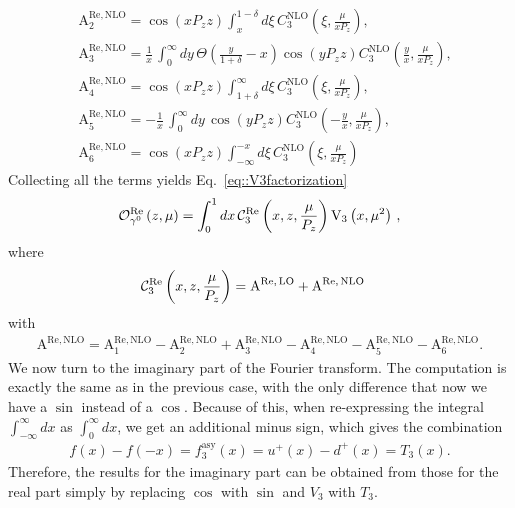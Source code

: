 \begin{align}
	& \text{A}^{\text{Re},\,\text{NLO}}_2 = \cos(x P_z z)\int_{x}^{1-\delta}d\xi \,
		C_3^{\text{NLO}}\left(\xi,\frac{\mu}{xP_z}\right), \\
	& \text{A}^{\text{Re},\,\text{NLO}}_3 = \frac{1}{x}\,\int_{0}^{\infty} dy\,
		\Theta\left(\frac{y}{1+\delta}-x\right) \cos\left(y P_z z\right)C_3^{\text{NLO}}\left(\frac{y}{x},\frac{\mu}{x P_z}\right), \\
	& \text{A}^{\text{Re},\,\text{NLO}}_4 = \cos(x P_z z)\int_{1+\delta}^{\infty}d\xi\,
		C_3^{\text{NLO}}\left(\xi,\frac{\mu}{xP_z}\right), \\
	& \text{A}^{\text{Re},\,\text{NLO}}_5 = -\frac{1}{x}\,\int_{0}^{\infty} dy\,
		\cos\left(y P_z z\right) 
		C_3^{\text{NLO}}\left(-\frac{y}{x},\frac{\mu}{x P_z}\right), \\
	& \text{A}^{\text{Re},\,\text{NLO}}_6 = \cos(x P_z z) \int_{-\infty}^{-x}d\xi \,
		C_3^{\text{NLO}}\left(\xi,\frac{\mu}{xP_z}\right)
\end{align}
Collecting all the terms yields Eq.~\eqref{eq::V3factorization}
\begin{align}
	\mathcal{O}_{\gamma^0}^{\text{Re}}\left( z,\mu \right) = \int_{0}^{1} dx \, \mathcal{C}_3^{\text{Re}}\left( x, z, \frac{\mu}{P_z}\right) 
	\mathrm{V}_3\left(x,\mu^2\right)\, , 
\end{align}
where
\begin{align}
	\mathcal{C}_3^{\text{Re}}&\left( x, z, \frac{\mu}{P_z}  \right) = 
	\text{A}^{\text{Re},\,\text{LO}} + \text{A}^{\text{Re},\,\text{NLO}}  
\end{align}
with
\begin{align}
	\text{A}^{\text{Re},\,\text{NLO}}= 
	\text{A}^{\text{Re}, \,\text{NLO}}_1 - \text{A}^{\text{Re}, \,\text{NLO}}_2 + \text{A}^{\text{Re}, \,\text{NLO}}_3 
	- \text{A}^{\text{Re}, \,\text{NLO}}_4 - \text{A}^{\text{Re}, \,\text{NLO}}_5 - \text{A}^{\text{Re}, \,\text{NLO}}_6. 
\end{align}
%
We now turn to the imaginary part of the Fourier transform. The computation is
exactly the same as in the previous case, with the only difference that now we
have a $\sin$ instead of a $\cos$. Because of this, when re-expressing the
integral $\int_{-\infty}^{\infty} dx$ as $\int_{0	}^{\infty} dx $, we get an
additional minus sign, which gives the combination
\begin{align} 
	f\left(x\right)-f\left(-x\right) = f_3^{\text{asy}}\left(x\right) = u^+\left(x\right) - d^+\left(x\right) = T_3\left(x\right). 
\end{align} 
Therefore, the results for the imaginary part can be obtained from those for the real part simply by replacing $\cos$ with $\sin$ and $V_3$ with $T_3$.